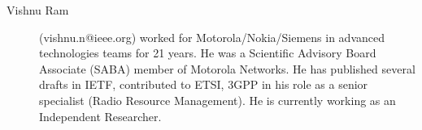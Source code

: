 \documentclass[twocolumn]{article}
\begin{document}
\begin{description}
	\item[Vishnu Ram] (vishnu.n@ieee.org) worked for Motorola/Nokia/Siemens in advanced technologies teams for 21 years. He was a Scientific Advisory Board Associate (SABA) member of Motorola Networks. He has published several drafts in IETF, contributed to ETSI, 3GPP in his role as a senior specialist (Radio Resource Management). He is currently working as an Independent Researcher. %
	
\end{description}
\end{document}
